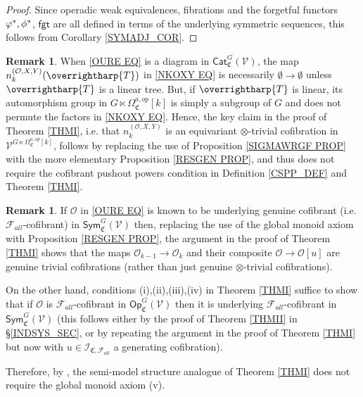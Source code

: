 \documentclass[a4paper,10pt
,draft
]{article}%
\numberwithin{equation}{section}
\numberwithin{figure}{section}
\theoremstyle{definition} %
\newtheorem{remark}[equation]{Remark}%
\newcommand{\vect}[1]{\text{\overrightharp{\ensuremath{#1}}}}
\newcommand{\F}{\ensuremath{\mathcal F}}
\newcommand{\V}{\ensuremath{\mathcal V}}
\renewcommand{\O}{\ensuremath{\mathcal O}}
\newcommand{\1}{\ensuremath{\mathbbm 1}}%
\begin{document}
\begin{proof}
	Since operadic weak equivalences, fibrations and the forgetful functors $\varphi^{\**},\phi^{\**}$, $\mathsf{fgt}$
	are all defined in terms of the underlying symmetric sequences,
	this follows from Corollary \ref{SYMADJ_COR}.
\end{proof}






\begin{remark}\label{CSPNTHI REM}
	When \eqref{OURE EQ}
	is a diagram in $\mathsf{Cat}^G_{\mathfrak{C}}(\V)$, 
	the map 
	$n_k^{(\mathcal{O},X,Y)}(\vect{T})$
	in \eqref{NKOXY EQ}
	is necessarily $\emptyset \to \emptyset$
	unless $\vect{T}$ is a linear tree.
	But, if $\vect{T}$ is linear,
	its automorphism group in 
	$G \ltimes \Omega_{\mathfrak{C}}^{a,op}[k]$
	is simply a subgroup of $G$
	and does not permute the factors in \eqref{NKOXY EQ}.
	Hence, the key claim in the proof of Theorem \ref{THMI},
	i.e. that 
	$n_k^{(\mathcal{O},X,Y)}$
	is an equivariant $\otimes$-trivial cofibration in
	$\V^{G \ltimes \Omega_{\mathfrak{C}}^{a,op}[k]}$,
	follows by replacing the use of Proposition \ref{SIGMAWRGF PROP}
	with the more elementary
	Proposition \ref{RESGEN PROP},
	and thus does not require
	the cofibrant pushout powers condition
	in Definition \ref{CSPP_DEF} and Theorem \ref{THMI}.
\end{remark}




\begin{remark}\label{THMISM REM}
	If $\O$ in \eqref{OURE EQ}
	is known to be underlying genuine cofibrant
	(i.e. $\F_{all}$-cofibrant) in 
	$\mathsf{Sym}^{G}_{\mathfrak{C}}(\V)$ 
	then, replacing the use of the global monoid axiom with 
	Proposition \ref{RESGEN PROP},
	the argument in the proof of Theorem \ref{THMI}
	shows that the maps
	$\O_{k-1} \to \O_k$
	and their composite
	$\O \to \O[u]$
	are genuine trivial cofibrations
	(rather than just genuine $\otimes$-trivial cofibrations).
	
	On the other hand, conditions (i),(ii),(iii),(iv) in Theorem \ref{THMI}
	suffice to show that if $\O$ is $\mathcal{F}_{all}$-cofibrant in 
	$\mathsf{Op}^G_{\mathfrak{C}}(\V)$
	then it is underlying $\mathcal{F}_{all}$-cofibrant in 
	$\mathsf{Sym}^G_{\mathfrak{C}}(\V)$
	(this follows either by the proof of Theorem \ref{THMII} in \S \ref{INDSYS_SEC},
	or by repeating the argument in the proof of Theorem \ref{THMI} but now with $u \in \mathcal{I}_{\mathfrak{C},\F_{all}}$
	a generating cofibration).
	
	Therefore, by \cite[Thm. 2.2.2]{WY18},
	the semi-model structure analogue of Theorem \ref{THMI}
	does not require the global monoid axiom (v).
\end{remark}
\end{document}
